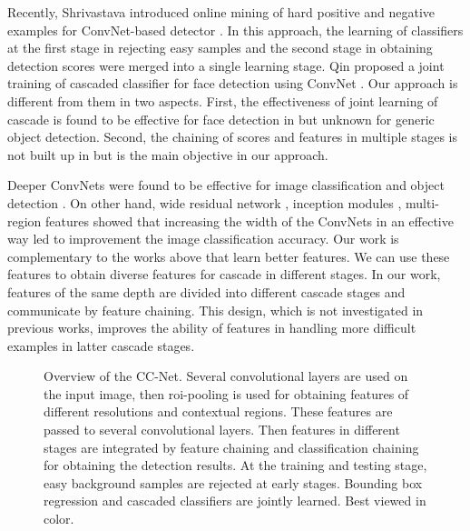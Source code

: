 \documentclass[10pt,twocolumn,letterpaper]{article}
\begin{document}
 Recently, Shrivastava \etal introduced online mining of hard positive and negative examples for ConvNet-based detector \cite{shrivastava2016training} . In this approach, the learning of classifiers at the first stage in rejecting easy samples and the second stage in obtaining detection scores were merged into a single learning stage.  
Qin \etal proposed a joint training of cascaded classifier for face detection using ConvNet \cite{qin2016joint}. Our approach is different from them in two aspects. First, the effectiveness of joint learning of cascade is found to be effective for face detection in \cite{qin2016joint} but unknown for generic object detection. Second, the chaining of scores and features in multiple stages is not built up in \cite{qin2016joint, shrivastava2016training} but is the main objective in our approach.

Deeper ConvNets were found to be effective for image classification and object detection \cite{Krizhevsky:ImageNetCNN,sermanet2013overfeat,simonyan2014very,szegedy2015going,he2016deep}. On other hand, wide residual network \cite{zagoruyko2016wide}, inception modules \cite{szegedy2015going, chollet2016deep}, multi-region features \cite{gidaris2015object, zeng2016gated,bell2015inside}  showed that increasing the width of the ConvNets in an effective way led to improvement the image classification accuracy. Our work is complementary to the works above that learn better features. We can use these features to obtain diverse features for cascade in different stages. In our work, features of the same depth are divided into different cascade stages and  communicate by feature chaining. This design, which is not investigated in previous works, improves the ability of features in handling more difficult examples in latter cascade stages.


\begin{figure*}
\begin{center}
\centerline{}
\end{center}
\vspace{-10pt}
   \caption{Overview of the CC-Net. Several convolutional layers are used on the input image, then roi-pooling is used for obtaining features of different resolutions and contextual regions. These features are passed to several convolutional layers. Then features in different stages are integrated by feature chaining and classification chaining for obtaining the detection results. At the training and testing stage, easy background samples are rejected at early stages. Bounding box regression and cascaded classifiers are jointly learned. Best viewed in color.}
\label{fig:overview}
\end{figure*}
\end{document}
